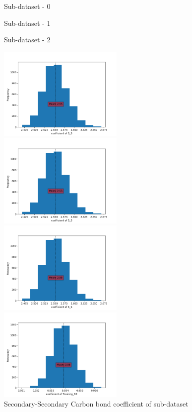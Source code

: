 \documentclass[preprint,12pt]{elsarticle}
\begin{document}
				    \begin{figure}[H]	
				    	\begin{multicols}{3}
				    		\centering
				    		Sub-dataset - 0 \par
				    		Sub-dataset - 1 \par
				    		Sub-dataset - 2 \par
				    	\end{multicols}	
				    	\begin{multicols}{3}
				    		\includegraphics[width=6cm]{SS2.png}\par
				    		\includegraphics[width=6cm]{SS2.png}\par
				    		\includegraphics[width=6cm]{SS2.png}\par
				    	\end{multicols}   	 					\caption{Secondary-Secondary Carbon bond coefficient of sub-dataset}	  		  
				    	\label{plot:histstart}	 
				    	\begin{multicols}{3}
				    		\includegraphics[width=6cm]{TrainingR20.png}\par 

\end{multicols}
\end{figure}
\end{document}

